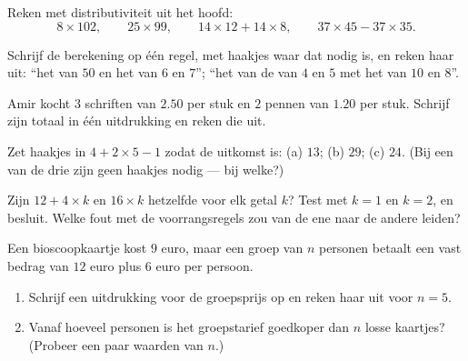 \begin{exercise}[$\star$]\label{exo:g7:priorities:5}
Reken met distributiviteit uit het hoofd:
\[
8 \times 102, \qquad
25 \times 99, \qquad
14 \times 12 + 14 \times 8, \qquad
37 \times 45 - 37 \times 35 .
\]
\end{exercise}

\begin{exercise}[$\star$]\label{exo:g7:priorities:6}
Schrijf de berekening op één regel, met haakjes waar dat nodig is, en reken haar
uit: ``het  van $50$ en het  van $6$ en $7$''; ``het  van
de  van $4$ en $5$ met het  van $10$ en $8$''.
\end{exercise}

\begin{exercise}[$\star$]\label{exo:g7:priorities:7}
Amir kocht $3$ schriften van $2.50$ per stuk en $2$ pennen van $1.20$ per stuk.
Schrijf zijn totaal in één uitdrukking en reken die uit.
\end{exercise}

\begin{exercise}[$\star\star$]\label{exo:g7:priorities:8}
Zet haakjes in $4 + 2 \times 5 - 1$ zodat de uitkomst is: (a) $13$; (b) $29$;
(c) $24$. (Bij een van de drie zijn geen haakjes nodig --- bij welke?)
\end{exercise}

\begin{exercise}[$\star\star$]\label{exo:g7:priorities:9}
Zijn $12 + 4 \times k$ en $16 \times k$ hetzelfde voor elk getal $k$? Test met
$k = 1$ en $k = 2$, en besluit. Welke fout met de voorrangsregels zou van de ene
naar de andere leiden?
\end{exercise}

\begin{exercise}[$\star\star$]\label{exo:g7:priorities:10}
Een bioscoopkaartje kost $9$ euro, maar een groep van $n$ personen betaalt een
vast bedrag van $12$ euro plus $6$ euro per persoon.
\begin{enumerate}
  \item Schrijf een uitdrukking voor de groepsprijs op en reken haar uit voor
        $n = 5$.
  \item Vanaf hoeveel personen is het groepstarief goedkoper dan $n$ losse
        kaartjes? (Probeer een paar waarden van $n$.)
\end{enumerate}
\end{exercise}

